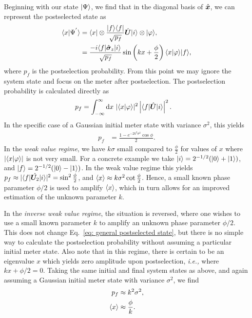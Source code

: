 Beginning with our state $\lvert \Psi\rangle$, we find that in the diagonal basis of $\hat{\bm x}$, we can represent the postselected state as 
\begin{align}\label{eq: general postselected state}
	\nonumber \langle x \vert \Psi^{'} \rangle &= \langle x \rvert \otimes \frac{\lvert f\rangle\langle f \rvert}{\sqrt{p_f}} \hat{\bm U} \lvert i\rangle \otimes \lvert \varphi\rangle, \\
	&= \frac{-i \langle f \rvert\hat{\bm \sigma}_z \lvert i\rangle}{\sqrt{p_f}} \sin \left(k x + \frac{\phi}{2}\right) \langle x \vert \varphi \rangle \lvert f\rangle,
\end{align}
where $p_f$ is the postselection probability.  From this point we may ignore the system state and focus on the meter after postselection.  The postselection probability is calculated directly as 
\begin{align}
	p_f &= \int_{-\infty}^{\infty} \text{d}x~ |\langle x \vert \varphi \rangle|^2 \left|\langle f \rvert\hat{\bm U} \lvert i\rangle\right|^2.
\end{align} 
In the specific case of a Gaussian initial meter state with variance $\sigma^2$, this yields 
\begin{align}\label{eq:postselection probability}
	p_f &= \frac{1 -  e^{-2k^2\sigma^2}\cos\phi}{2}.
\end{align}
In the \emph{weak value regime}, we have $k\sigma$ small compared to $\frac{\phi}{2}$ for values of $x$ where $|\langle x \vert \varphi \rangle|$ is not very small.  For a concrete example we take $\lvert i\rangle = 2^{-1/2}(\lvert 0\rangle + \lvert 1\rangle)$, and  $\lvert f\rangle = 2^{-1/2}(\lvert 0\rangle - \lvert 1\rangle)$.  In the weak value regime this yields $p_f \approx |\langle f \rvert\hat{\bm U_2}\lvert i\rangle|^2 =\sin^2 \frac{\phi}{2}$, and $\left\langle x \right\rangle \approx k \sigma^2 \cot \frac{\phi}{2}$.  Hence, a small known phase parameter $\phi/2$ is used to amplify $\left\langle x \right\rangle$, which in turn allows for an improved estimation of the unknown parameter $k$.

In the \emph{inverse weak value regime}, the situation is reversed, where one wishes to use a small known parameter $k$ to amplify an unknown phase parameter $\phi/{2}$.  This does not change Eq.~\eqref{eq: general postselected state}, but there is no simple way to calculate the postselection probability without assuming a particular initial meter state.  Also note that in this regime, there is certain to be an eigenvalue $x$ which yields zero amplitude upon postselection, \emph{i.e.,} where $k x + \phi/{2} = 0$.  Taking the same initial and final system states as above, and again assuming a Gaussian initial meter state with variance $\sigma^2$, we find 
\begin{align}\label{eq:noiseless iwv}
	\nonumber p_f &\approx k^2 \sigma^2, \\
	\left\langle x \right\rangle &\approx \frac{\phi}{k}.
\end{align}

